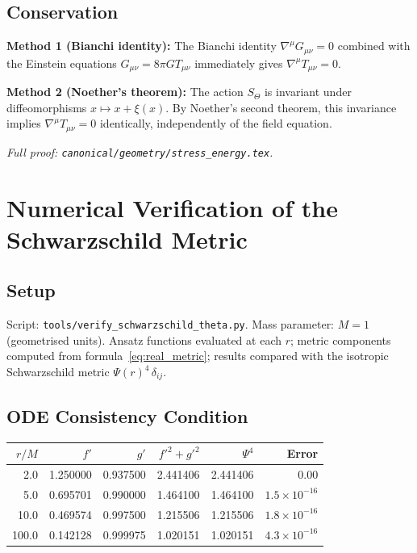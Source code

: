 \documentclass[12pt,a4paper]{article}
\theoremstyle{definition}
\theoremstyle{remark}
\newcommand{\Gmn}{G_{\mu\nu}}
\newcommand{\Tmn}{T_{\mu\nu}}
\begin{document}
\subsection{Conservation}

\textbf{Method 1 (Bianchi identity):}
The Bianchi identity $\nabla^\mu\Gmn = 0$ combined with the Einstein equations
$\Gmn = 8\pi G\Tmn$ immediately gives $\nabla^\mu\Tmn = 0$.

\textbf{Method 2 (Noether's theorem):}
The action $S_\Theta$ is invariant under diffeomorphisms $x\mapsto x + \xi(x)$.
By Noether's second theorem, this invariance implies $\nabla^\mu\Tmn = 0$
identically, independently of the field equation.

\textit{Full proof: \texttt{canonical/geometry/stress\_energy.tex}.}

\section{Numerical Verification of the Schwarzschild Metric}
\label{app:numerics}

\subsection{Setup}

Script: \texttt{tools/verify\_schwarzschild\_theta.py}.
Mass parameter: $M = 1$ (geometrised units).
Ansatz functions evaluated at each $r$; metric components computed from
formula~\eqref{eq:real_metric}; results compared with the isotropic Schwarzschild
metric $\Psi(r)^4\,\delta_{ij}$.

\subsection{ODE Consistency Condition}

\begin{center}
\begin{tabular}{rrrrrr}
\toprule
$r/M$ & $f'$ & $g'$ & $f'^2+g'^2$ & $\Psi^4$ & Error \\
\midrule
2.0   & 1.250000 & 0.937500 & 2.441406 & 2.441406 & $0.00$ \\
5.0   & 0.695701 & 0.990000 & 1.464100 & 1.464100 & $1.5\times10^{-16}$ \\
10.0  & 0.469574 & 0.997500 & 1.215506 & 1.215506 & $1.8\times10^{-16}$ \\
100.0 & 0.142128 & 0.999975 & 1.020151 & 1.020151 & $4.3\times10^{-16}$ \\
\bottomrule
\end{tabular}
\end{center}
\end{document}
